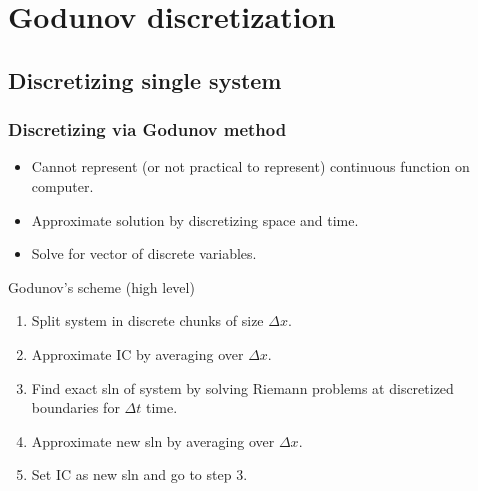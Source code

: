 \section[godunov]{Godunov discretization} %
\label{sec:godunov_discretization}

\subsection{Discretizing single system} %
\label{sub:discretizing_single_system}


\begin{frame}
\frametitle{Discretizing via Godunov method}

\begin{itemize}
    \item Cannot represent (or not practical to represent) continuous function on computer.
    \item Approximate solution by discretizing space and time.
    \item Solve for vector of discrete variables.
\end{itemize}

\begin{block}{Godunov's scheme (high level)}
\begin{enumerate}
    \item Split system in discrete chunks of size $\Delta x$.
    \item Approximate IC by averaging over $\Delta x$.
    \item Find exact sln of system by solving Riemann problems at discretized boundaries for $\Delta t$ time.
    \item Approximate new sln by averaging over $\Delta x$.
    \item Set IC as new sln and go to step 3.
\end{enumerate}
\end{block}

\end{frame}

